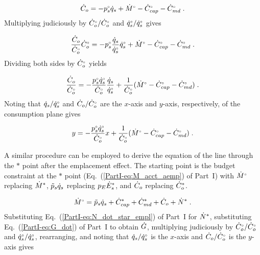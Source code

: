 \begin{equation}
  \rate{C}_o = - \bempl{p}_s \rate{q}_s + \rbempl{M} - \rbempl{C}_{cap} - \rbempl{C}_{\md} \; .
\end{equation}
%
Multiplying judiciously by $\rbempl{C}_o/\rbempl{C}_o$ and $\rbempl{q}_s/\rbempl{q}_s$ gives

\begin{equation}
  \frac{\rate{C}_o}{\rbempl{C}_o} \rbempl{C}_o
       = - \bempl{p}_s \frac{\rate{q}_s}{\rbempl{q}_s} \rbempl{q}_s 
         + \rbempl{M} - \rbempl{C}_{cap} - \rbempl{C}_{\md} \; .
\end{equation}
%
Dividing both sides by $\rbempl{C}_o$ yields

\begin{equation}
  \frac{\rate{C}_o}{\rbempl{C}_o}
       = - \frac{\bempl{p}_s \rbempl{q}_s}{\rbempl{C}_o} \frac{\rate{q}_s}{\rbempl{q}_s}
         + \frac{1}{\rbempl{C}_o} (\rbempl{M} - \rbempl{C}_{cap} - \rbempl{C}_{\md}) \; .
\end{equation}
%
Noting that  
$\rate{q}_s/\rbempl{q}_s$ and 
$\rate{C}_o/\rbempl{C}_o$ are
the $x$-axis and $y$-axis, respectively,
of the consumption plane gives

\begin{equation} \label{eq:orig_line_prefs}
  y = - \frac{\bempl{p}_s \rbempl{q}_s}{\rbempl{C}_o} x
         + \frac{1}{\rbempl{C}_o} (\rbempl{M} - \rbempl{C}_{cap} - \rbempl{C}_{\md}) \; .
\end{equation}

A similar procedure can be employed to derive the equation of the
\starstar{} line through the $*$ point
after the emplacement effect.
The starting point is the budget constraint at the $*$ point
(Eq.~(\ref{PartI-eq:M_acct_aemp}) of Part~I)
with $\rorig{M}$ replacing $\raempl{M}$, 
$\amacro{p}_s \rate{q}_s$ replacing $p_E \raempl{E}_s$, and
$\rate{C}_o$ replacing $\raempl{C}_o$.

\begin{equation}
  \rbempl{M} = \amacro{p}_s \rate{q}_s + \raempl{C}_{cap} + \raempl{C}_{\md} + \rate{C}_o + \raempl{N} \; .
\end{equation}
%
Substituting Eq.~(\ref{PartI-eq:N_dot_star_empl}) of Part~I for $\raempl{N}$,
substituting Eq.~(\ref{PartI-eq:G_dot}) of Part~I to obtain $\rate{G}$,
multiplying judiciously by $\rbempl{C}_o/\rbempl{C}_o$ and $\rbempl{q}_s/\rbempl{q}_s$, 
rearranging, and noting that 
$\rate{q}_s/\rbempl{q}_s$ is the $x$-axis and 
$\rate{C}_o/\rbempl{C}_o$ is the $y$-axis gives

